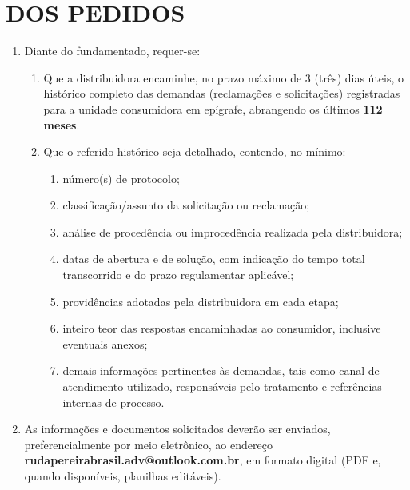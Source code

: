 \section{DOS PEDIDOS}

\begin{enumerate}[resume]  
  \item Diante do fundamentado, requer-se: 
  \begin{enumerate}
    \item Que a distribuidora encaminhe, no prazo máximo de 3 (três) dias úteis, o histórico completo das demandas (reclamações e solicitações) registradas para a unidade consumidora em epígrafe, abrangendo os últimos \textbf{112 meses}.
    \item Que o referido histórico seja detalhado, contendo, no mínimo:
      \begin{enumerate}
        \item número(s) de protocolo;
        \item classificação/assunto da solicitação ou reclamação;
        \item análise de procedência ou improcedência realizada pela distribuidora;
        \item datas de abertura e de solução, com indicação do tempo total transcorrido e do prazo regulamentar aplicável;
        \item providências adotadas pela distribuidora em cada etapa;
        \item inteiro teor das respostas encaminhadas ao consumidor, inclusive eventuais anexos;
        \item demais informações pertinentes às demandas, tais como canal de atendimento utilizado, responsáveis pelo tratamento e referências internas de processo.
      \end{enumerate}
    \end{enumerate}
  \item  As informações e documentos solicitados deverão ser enviados, preferencialmente por meio eletrônico, ao endereço \textbf{rudapereirabrasil.adv@outlook.com.br}, em formato digital (PDF e, quando disponíveis, planilhas editáveis).
\end{enumerate}





